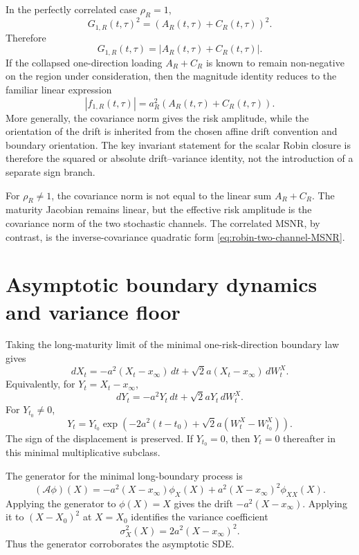 \documentclass[11pt]{article}
\numberwithin{equation}{section}
\begin{document}
In the perfectly correlated case \(\rho_R=1\),
\[
G_{1,R}(t,\tau)^2=
\left(A_R(t,\tau)+C_R(t,\tau)\right)^2.
\]
Therefore
\[
G_{1,R}(t,\tau)=
\left|A_R(t,\tau)+C_R(t,\tau)\right|.
\]
If the collapsed one-direction loading \(A_R+C_R\) is known to remain non-negative on the region under consideration, then the magnitude identity reduces to the familiar linear expression
\[
|f_{1,R}(t,\tau)|
=a_R^2\left(A_R(t,\tau)+C_R(t,\tau)\right).
\]
More generally, the covariance norm gives the risk amplitude, while the orientation of the drift is inherited from the chosen affine drift convention and boundary orientation. The key invariant statement for the scalar Robin closure is therefore the squared or absolute drift--variance identity, not the introduction of a separate sign branch.

For \(\rho_R\neq1\), the covariance norm is not equal to the linear sum \(A_R+C_R\). The maturity Jacobian remains linear, but the effective risk amplitude is the covariance norm of the two stochastic channels. The correlated MSNR, by contrast, is the inverse-covariance quadratic form \eqref{eq:robin-two-channel-MSNR}.

\section{Asymptotic boundary dynamics and variance floor}

Taking the long-maturity limit of the minimal one-risk-direction boundary law gives
\begin{equation}
\label{eq:long-boundary-sde-X}
dX_t
=
-a^2(X_t-x_\infty)\,dt
+
\sqrt{2}a(X_t-x_\infty)\,dW_t^X.
\end{equation}
Equivalently, for \(Y_t=X_t-x_\infty\),
\begin{equation}
\label{eq:multiplicative-displacement-law}
dY_t
=
-a^2Y_t\,dt
+
\sqrt{2}aY_t\,dW_t^X.
\end{equation}
For \(Y_{t_0}\neq0\),
\begin{equation}
\label{eq:Y-explicit-solution}
Y_t
=
Y_{t_0}
\exp\left(-2a^2(t-t_0)+\sqrt{2}a(W_t^X-W_{t_0}^X)\right).
\end{equation}
The sign of the displacement is preserved. If \(Y_{t_0}=0\), then \(Y_t=0\) thereafter in this minimal multiplicative subclass.

The generator for the minimal long-boundary process is
\begin{equation}
\label{eq:long-boundary-generator}
(\mathcal A\phi)(X)
=
-a^2(X-x_\infty)\phi_X(X)
+
a^2(X-x_\infty)^2\phi_{XX}(X).
\end{equation}
Applying the generator to \(\phi(X)=X\) gives the drift \(-a^2(X-x_\infty)\). Applying it to \((X-X_0)^2\) at \(X=X_0\) identifies the variance coefficient
\[
\sigma_X^2(X)=2a^2(X-x_\infty)^2.
\]
Thus the generator corroborates the asymptotic SDE.
\end{document}
